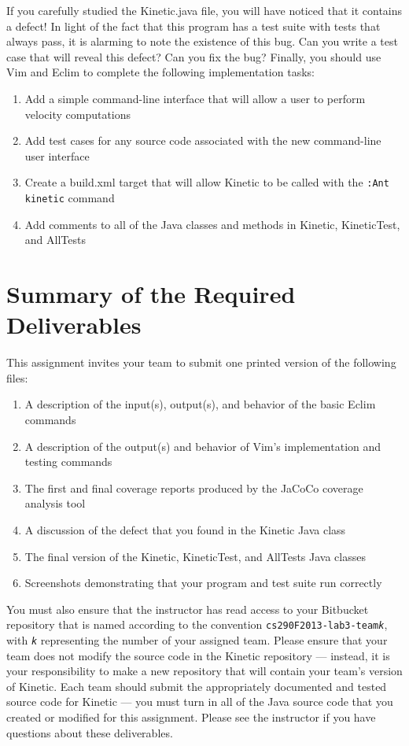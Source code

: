 If you carefully studied the Kinetic.java file, you will have noticed that it contains a defect! In light of the fact
that this program has a test suite with tests that always pass, it is alarming to note the existence of this bug. 
Can you write a test case that will reveal this defect? Can you fix the bug?  Finally, you should use Vim and Eclim to
complete the following implementation tasks:

\vspace*{-.1in}
\begin{enumerate}

	\item Add a simple command-line interface that will allow a user to perform velocity computations
	\item Add test cases for any source code associated with the new command-line user interface	
	\item Create a build.xml target that will allow Kinetic to be called with the {\tt :Ant kinetic} command
	\item Add comments to all of the Java classes and methods in Kinetic, KineticTest, and AllTests

\end{enumerate}

\section*{Summary of the Required Deliverables}

This assignment invites your team to submit one printed version of the following files:

\begin{enumerate}
	
	\item A description of the input(s), output(s), and behavior of the basic Eclim commands 
	\item A description of the output(s) and behavior of Vim's implementation and testing commands
	\item The first and final coverage reports produced by the JaCoCo coverage analysis tool
	\item A discussion of the defect that you found in the Kinetic Java class
	\item The final version of the Kinetic, KineticTest, and AllTests Java classes
	\item Screenshots demonstrating that your program and test suite run correctly
\end{enumerate}

You must also ensure that the instructor has read access to your Bitbucket repository that is named according to the
convention {\tt cs290F2013-lab3-team{\em k}}, with {\tt {\em k}} representing the number of your assigned team.  Please
ensure that your team does not modify the source code in the Kinetic repository --- instead, it is your responsibility
to make a new repository that will contain your team's version of Kinetic.  Each team should submit the appropriately
documented and tested source code for Kinetic --- you must turn in all of the Java source code that you created
or modified for this assignment. Please see the instructor if you have questions about these deliverables.


